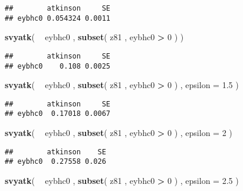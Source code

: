 \documentclass[]{book}
\newenvironment{Shaded}{\begin{snugshade}}{\end{snugshade}}
\newcommand{\DataTypeTok}[1]{\textcolor[rgb]{0.13,0.29,0.53}{#1}}
\newcommand{\DecValTok}[1]{\textcolor[rgb]{0.00,0.00,0.81}{#1}}
\newcommand{\FloatTok}[1]{\textcolor[rgb]{0.00,0.00,0.81}{#1}}
\newcommand{\KeywordTok}[1]{\textcolor[rgb]{0.13,0.29,0.53}{\textbf{#1}}}
\newcommand{\NormalTok}[1]{#1}
\newcommand{\OperatorTok}[1]{\textcolor[rgb]{0.81,0.36,0.00}{\textbf{#1}}}
\newcommand{\StringTok}[1]{\textcolor[rgb]{0.31,0.60,0.02}{#1}}
\begin{document}
\begin{verbatim}
##        atkinson     SE
## eybhc0 0.054324 0.0011
\end{verbatim}

\begin{Shaded}
\begin{Highlighting}[]
\KeywordTok{svyatk}\NormalTok{( }\OperatorTok{~}\StringTok{ }\NormalTok{eybhc0 , }\KeywordTok{subset}\NormalTok{( z81 , eybhc0 }\OperatorTok{>}\StringTok{ }\DecValTok{0}\NormalTok{ ) )}
\end{Highlighting}
\end{Shaded}

\begin{verbatim}
##        atkinson     SE
## eybhc0    0.108 0.0025
\end{verbatim}

\begin{Shaded}
\begin{Highlighting}[]
\KeywordTok{svyatk}\NormalTok{( }\OperatorTok{~}\StringTok{ }\NormalTok{eybhc0 , }\KeywordTok{subset}\NormalTok{( z81 , eybhc0 }\OperatorTok{>}\StringTok{ }\DecValTok{0}\NormalTok{ ) , }\DataTypeTok{epsilon =} \FloatTok{1.5}\NormalTok{ )}
\end{Highlighting}
\end{Shaded}

\begin{verbatim}
##        atkinson     SE
## eybhc0  0.17018 0.0067
\end{verbatim}

\begin{Shaded}
\begin{Highlighting}[]
\KeywordTok{svyatk}\NormalTok{( }\OperatorTok{~}\StringTok{ }\NormalTok{eybhc0 , }\KeywordTok{subset}\NormalTok{( z81 , eybhc0 }\OperatorTok{>}\StringTok{ }\DecValTok{0}\NormalTok{ ) , }\DataTypeTok{epsilon =} \DecValTok{2}\NormalTok{ )}
\end{Highlighting}
\end{Shaded}

\begin{verbatim}
##        atkinson    SE
## eybhc0  0.27558 0.026
\end{verbatim}

\begin{Shaded}
\begin{Highlighting}[]
\KeywordTok{svyatk}\NormalTok{( }\OperatorTok{~}\StringTok{ }\NormalTok{eybhc0 , }\KeywordTok{subset}\NormalTok{( z81 , eybhc0 }\OperatorTok{>}\StringTok{ }\DecValTok{0}\NormalTok{ ) , }\DataTypeTok{epsilon =} \FloatTok{2.5}\NormalTok{ )}
\end{Highlighting}
\end{Shaded}
\end{document}
